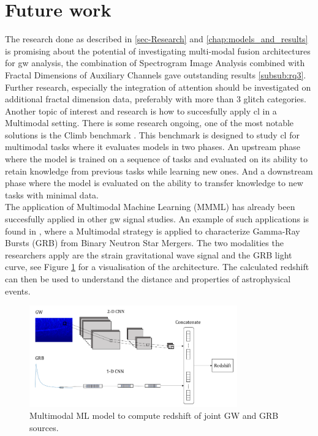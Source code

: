\section{Future work}
The research done as described in \ref{sec-Research} and \ref{chap:models_and_results} is promising about the potential of investigating multi-modal fusion architectures for \acrshort{gw} analysis, the combination of Spectrogram Image Analysis combined with Fractal Dimensions of Auxiliary Channels gave outstanding results \ref{subsub:rq3}. \\
Further research, especially the integration of attention \citep{vaswani2017attention, niu2021review} should be investigated on additional fractal dimension data, preferably with more than 3 glitch categories. \\
Another topic of interest and research is how to succesfully apply \acrshort{cl} in a Multimodal setting. There is some research ongoing, one of the most notable solutions is the Climb benchmark \citep{srinivasan2022climb}. This benchmark is designed to study \acrshort{cl} for multimodal tasks where it evaluates models in two phases. An upstream phase where the model is trained on a sequence of tasks and evaluated on its ability to retain knowledge from previous tasks while learning new ones. And a downstream phase where the model is evaluated on the ability to transfer knowledge to new tasks with minimal data.\\
The application of Multimodal Machine Learning (MMML) has already been succesfully applied in other \acrshort{gw} signal studies. An example of such applications is found in \citep{cuoco2021multimodal}, where a Multimodal strategy is applied to characterize Gamma-Ray Bursts (GRB) from Binary Neutron Star Mergers. The two modalities the researchers apply are the strain gravitational wave signal and the GRB light curve, see Figure \ref{fig:multimodal_redshift} for a visualisation of the architecture. The calculated redshift can then be used to understand the distance and properties of astrophysical events. 

\begin{figure}[hb]
    \centering
    \includegraphics[width=0.8\textwidth]{Grad Assignment/Images/futureWork.png}
    \caption{Multimodal ML model to compute redshift of joint GW and GRB sources. \citep{cuoco2021multimodal}}
    \label{fig:multimodal_redshift}
\end{figure}
